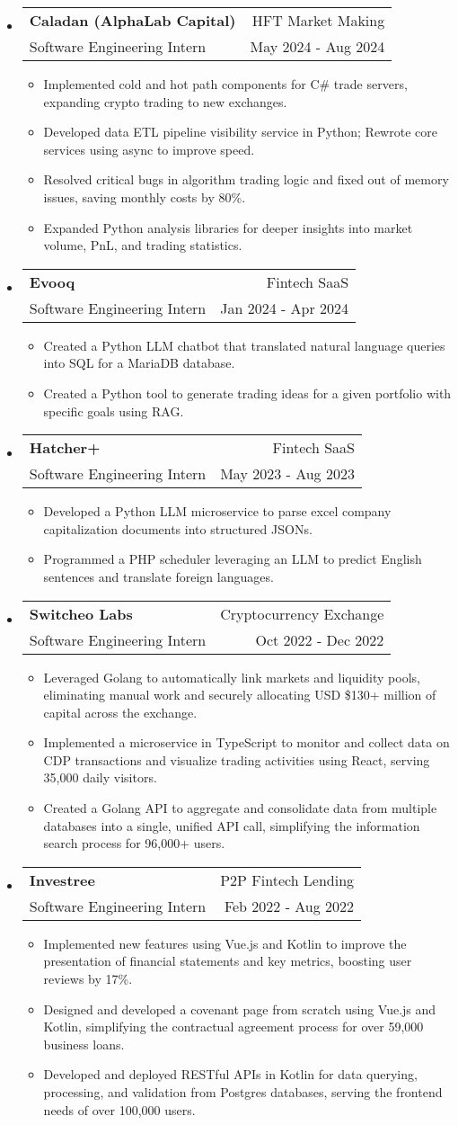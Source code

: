 \documentclass[letterpaper, 11pt]{article}
\makeatletter
\newcommand{\ResumeEntryTSDL}[4]{
  \vspace{1pt}\item
    \begin{tabular*}{\textwidth}[t]{l@{\extracolsep{\fill}}r} 
      \textbf{#1} & #2 \\
      #3 & #4 \\
    \end{tabular*}\vspace{-2.835pt} %
}
\newcommand{\ResumeItemDefault}[1]{
  \item{
    #1 \vspace{-2.835pt}
  }
}
\newcommand{\ResumeEntryStart}{\begin{itemize}[leftmargin=0mm, label={}]}
\newcommand{\ResumeEntryEnd}{\end{itemize}\vspace{-2.835pt}} %
\newcommand{\ResumeItemListStart}{\begin{itemize}[leftmargin=5mm, label=$\bullet$, itemsep=1mm, parsep=1mm]} %
\newcommand{\ResumeItemListEnd}{\end{itemize}}
\makeatother
\begin{document}
  \ResumeEntryStart
  \ResumeEntryTSDL{Caladan (AlphaLab Capital)}{HFT Market Making}{Software Engineering Intern}{May 2024 - Aug 2024}
  \ResumeItemListStart
  \ResumeItemDefault{Implemented cold and hot path components for C\# trade servers, expanding crypto trading to new exchanges.}
  \ResumeItemDefault{Developed data ETL pipeline visibility service in Python; Rewrote core services using async to improve speed.}
  \ResumeItemDefault{Resolved critical bugs in algorithm trading logic and fixed out of memory issues, saving monthly costs by 80\%.}
  \ResumeItemDefault{Expanded Python analysis libraries for deeper insights into market volume, PnL, and trading statistics.}
  \ResumeItemListEnd
  \ResumeEntryEnd

  \ResumeEntryStart
    \ResumeEntryTSDL{Evooq}{Fintech SaaS}{Software Engineering Intern}{Jan 2024 - Apr 2024}
    \ResumeItemListStart
    \ResumeItemDefault{Created a Python LLM chatbot that translated natural language queries into SQL for a MariaDB database.}
    \ResumeItemDefault{Created a Python tool to generate trading ideas for a given portfolio with specific goals using RAG.}
    \ResumeItemListEnd
  \ResumeEntryEnd

  \ResumeEntryStart
    \ResumeEntryTSDL{Hatcher+}{Fintech SaaS}{Software Engineering Intern}{May 2023 - Aug 2023}
    \ResumeItemListStart
      \ResumeItemDefault{Developed a Python LLM microservice to parse excel company capitalization documents into structured JSONs.}
      \ResumeItemDefault{Programmed a PHP scheduler leveraging an LLM to predict English sentences and translate foreign languages.}
    \ResumeItemListEnd
  \ResumeEntryEnd

  \ResumeEntryStart
    \ResumeEntryTSDL{Switcheo Labs}{Cryptocurrency Exchange}{Software Engineering Intern}{Oct 2022 - Dec 2022}
    \ResumeItemListStart
    \ResumeItemDefault{Leveraged Golang to automatically link markets and liquidity pools, eliminating manual work and securely allocating USD \$130+ million of capital across the exchange.}
    \ResumeItemDefault{Implemented a microservice in TypeScript to monitor and collect data on CDP transactions and visualize trading activities using React, serving 35,000 daily visitors.}
    \ResumeItemDefault{Created a Golang API to aggregate and consolidate data from multiple databases into a single, unified API call, simplifying the information search process for 96,000+ users.}
    \ResumeItemListEnd
  \ResumeEntryEnd

  \ResumeEntryStart
    \ResumeEntryTSDL{Investree}{P2P Fintech Lending}{Software Engineering Intern}{Feb 2022 - Aug 2022}
    \ResumeItemListStart
      \ResumeItemDefault{Implemented new features using Vue.js and Kotlin to improve the presentation of financial statements and key metrics, boosting user reviews by 17\%.}
      \ResumeItemDefault{Designed and developed a covenant page from scratch using Vue.js and Kotlin, simplifying the contractual agreement process for over 59,000 business loans.}
      \ResumeItemDefault{Developed and deployed RESTful APIs in Kotlin for data querying, processing, and validation from Postgres databases, serving the frontend needs of over 100,000 users.}
    \ResumeItemListEnd
  \ResumeEntryEnd
\end{document}
